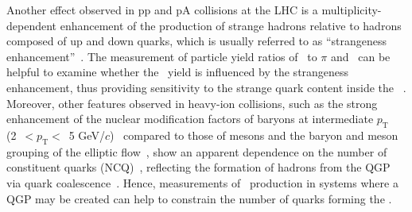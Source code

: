 Another effect observed in pp and pA collisions at the LHC is a multiplicity-dependent enhancement of the production of strange hadrons relative to hadrons composed of up and down quarks, which is usually referred to as ``strangeness enhancement''~\cite{ALICE:2016fzo}. The measurement of particle yield ratios of \fzero~to $\pi$ and \kstar~can be helpful to examine whether the \fzero~yield is influenced by the strangeness enhancement, thus providing sensitivity to the strange quark content inside the \fzero~\cite{LHCb:2014ooi, LHCb:2014vbo}. Moreover, other features observed in heavy-ion collisions, such as the strong enhancement of the nuclear modification factors of baryons at intermediate $p_{\mathrm{T}}$ (2~$<p_{\mathrm{T}}<$~5 GeV/$c$)~\cite{Fries:2003vb, ALICE:2022wpn} compared to those of mesons and the baryon and meson grouping of the elliptic flow~\cite{Wang:2022det}, show an apparent dependence on the number of constituent quarks (NCQ)~\cite{Wang:2022det}, reflecting the formation of hadrons from the QGP via quark coalescence~\cite{Fries:2003vb}. Hence, measurements of \fzero~production in systems where a QGP may be created can help to constrain the number of quarks forming the \fzero.

